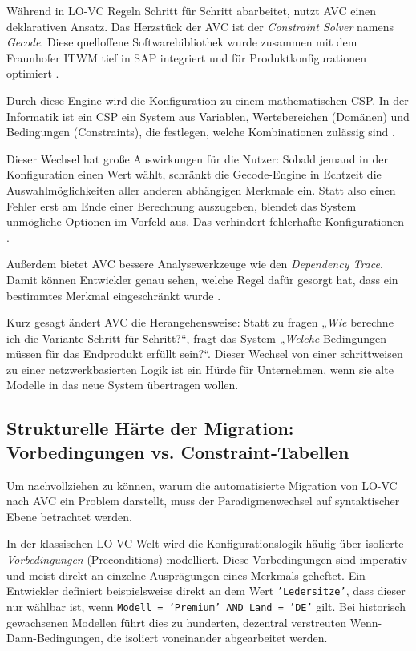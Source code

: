 Während in \ac{LO-VC} Regeln Schritt für Schritt abarbeitet, nutzt \ac{AVC} einen deklarativen Ansatz. Das Herzstück der \ac{AVC} ist der \textit{Constraint Solver} namens \textit{Gecode}. Diese quelloffene Softwarebibliothek wurde zusammen mit dem Fraunhofer ITWM tief in SAP integriert und für Produktkonfigurationen optimiert \parencite[S. 35]{blumohrAdvancedVariantConfiguration2023}.

Durch diese Engine wird die Konfiguration zu einem mathematischen \ac{CSP}. In der Informatik ist ein \ac{CSP} ein System aus Variablen, Wertebereichen (Domänen) und Bedingungen (Constraints), die festlegen, welche Kombinationen zulässig sind \parencite[S. 180]{russellArtificialIntelligenceModern2010}.

Dieser Wechsel hat große Auswirkungen für die Nutzer: Sobald jemand in der Konfiguration einen Wert wählt, schränkt die Gecode-Engine in Echtzeit die Auswahlmöglichkeiten aller anderen abhängigen Merkmale ein. Statt also einen Fehler erst am Ende einer Berechnung auszugeben, blendet das System unmögliche Optionen im Vorfeld aus. Das verhindert fehlerhafte Konfigurationen \parencite[S. 35]{blumohrAdvancedVariantConfiguration2023}.

Außerdem bietet \ac{AVC} bessere Analysewerkzeuge wie den \textit{Dependency Trace}. Damit können Entwickler genau sehen, welche Regel dafür gesorgt hat, dass ein bestimmtes Merkmal eingeschränkt wurde \parencite[S. 37]{blumohrAdvancedVariantConfiguration2023}.

Kurz gesagt ändert \ac{AVC} die Herangehensweise: Statt zu fragen „\textit{Wie} berechne ich die Variante Schritt für Schritt?“, fragt das System „\textit{Welche} Bedingungen müssen für das Endprodukt erfüllt sein?“. Dieser Wechsel von einer schrittweisen zu einer netzwerkbasierten Logik ist ein Hürde für Unternehmen, wenn sie alte Modelle in das neue System übertragen wollen.

\subsection{Strukturelle Härte der Migration: Vorbedingungen vs. Constraint-Tabellen}
\label{sec:lovc_avc_syntax}

Um nachvollziehen zu können, warum die automatisierte Migration von \ac{LO-VC} nach \ac{AVC} ein Problem darstellt, muss der Paradigmenwechsel auf syntaktischer Ebene betrachtet werden.

In der klassischen \ac{LO-VC}-Welt wird die Konfigurationslogik häufig über isolierte \textit{Vorbedingungen} (Preconditions) modelliert. Diese Vorbedingungen sind imperativ und meist direkt an einzelne Ausprägungen eines Merkmals geheftet. Ein Entwickler definiert beispielsweise direkt an dem Wert \texttt{'Ledersitze'}, dass dieser nur wählbar ist, wenn \texttt{Modell = 'Premium' AND Land = 'DE'} gilt. Bei historisch gewachsenen Modellen führt dies zu hunderten, dezentral verstreuten Wenn-Dann-Bedingungen, die isoliert voneinander abgearbeitet werden.

